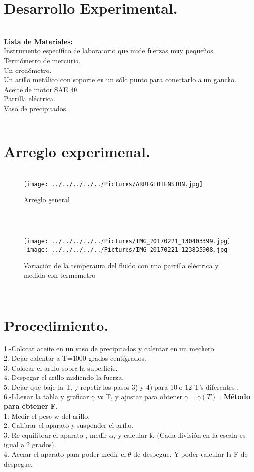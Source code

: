 \documentclass[10pt,a4paper]{article}
\begin{document}
\section*{Desarrollo Experimental.}\\
\textbf{Lista de Materiales:} \\
Instrumento espec\'{i}fico de laboratorio que mide fuerzas muy peque\~{n}os.\\
Term\'{o}metro de mercurio. \\
Un cron\'{o}metro. \\
Un arillo met\'{a}lico con soporte en un s\'{o}lo punto para conectarlo a un gancho. \\
Aceite de motor SAE 40.\\
Parrilla el\'{e}ctrica. \\
Vaso de precipitados.\\
\\
\section*{Arreglo experimenal.}
\begin{figure}[hbtp]
\centering
\\
\texttt{[image: ../../../../../Pictures/ARREGLOTENSION.jpg]} 
\caption{Arreglo general}
\end{figure} 
\\
\begin{figure}[hbtp]
\centering
\\
\texttt{[image: ../../../../../Pictures/IMG\_20170221\_130403399.jpg]} 
\texttt{[image: ../../../../../Pictures/IMG\_20170221\_123835908.jpg]} 
\caption{Variaci\'{o}n de la temperaura del fluido con una parrilla el\'{e}ctrica y medida con term\'{o}metro} 
\end{figure} 
\\
\section*{Procedimiento.}
1.-Colocar aceite en un vaso de precipitados y calentar en un mechero.\\
2.-Dejar calentar a T=1000 grados cent\'{i}grados.\\
3.-Colocar el arillo sobre la superficie. \\
4.-Despegar el arillo midiendo la fuerza.\\
5.-Dejar que baje la T, y repetir los pasos 3) y 4) para 10 o 12 T's diferentes .\\
6.-LLenar la tabla y graficar $\gamma$ vs T, y ajustar para obtener $\gamma= \gamma (T)$ .
\textbf{M\'{e}todo para obtener F.}\\
1.-Medir el peso w del arillo.\\
2.-Calibrar el aparato y suspender el arillo.\\
3.-Re-equilibrar el aparato , medir $\alpha $, y calcular k. (Cada divisi\'{o}n en la escala es igual a 2 grados). \\
4.-Acerar el aparato para poder medir el $\theta$ de despegue. Y poder calcular la F de despegue.\\ 
\end{document}
